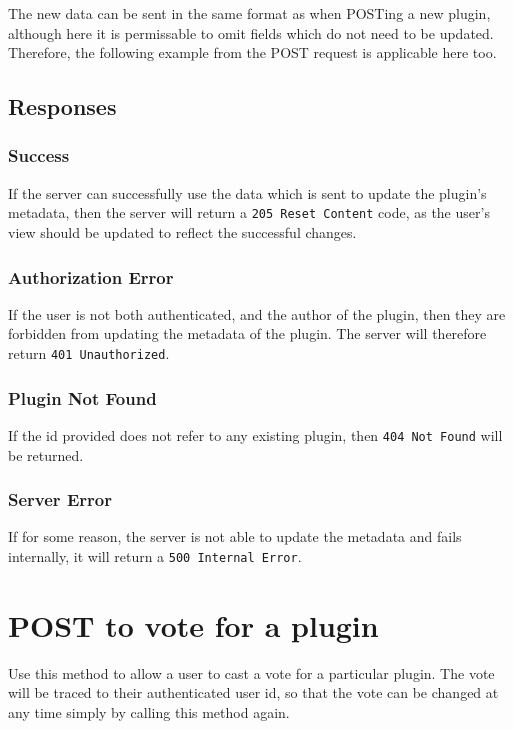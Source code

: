 \documentclass[a4paper, 12pt]{article}
\begin{document}
			The new data can be sent in the same format as when POSTing a new plugin, although here it is permissable to omit fields which do not need to be updated. Therefore, the following example from the POST request is applicable here too.

			

		\subsection{Responses}
			\subsubsection{Success}
				If the server can successfully use the data which is sent to update the plugin's metadata, then the server will return a \verb|205 Reset Content| code, as the user's view should be updated to reflect the successful changes.

			\subsubsection{Authorization Error}
				If the user is not both authenticated, and the author of the plugin, then they are forbidden from updating the metadata of the plugin. The server will therefore return \verb|401 Unauthorized|.

			\subsubsection{Plugin Not Found}
				If the id provided does not refer to any existing plugin, then \verb|404 Not Found| will be returned.

			\subsubsection{Server Error}
				If for some reason, the server is not able to update the metadata and fails internally, it will return a \verb|500 Internal Error|.

	\section{POST to vote for a plugin}
		Use this method to allow a user to cast a vote for a particular plugin. The vote will be traced to their authenticated user id, so that the vote can be changed at any time simply by calling this method again.
\end{document}

